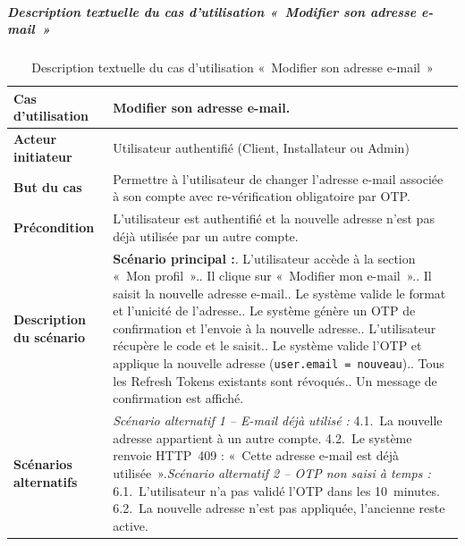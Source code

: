 \subparagraph{Description textuelle du cas d'utilisation «~Modifier son adresse e-mail~»}

\begin{table}[H]
  \caption{Description textuelle du cas d'utilisation «~Modifier son adresse e-mail~»}
  \label{tab:cu-modifier-email}
  \centering
  \begin{tabularx}{\textwidth}{|L{3.8cm}|X|}
    \hline
    \textbf{Cas d'utilisation} & Modifier son adresse e-mail. \\
    \hline
    \textbf{Acteur initiateur} & Utilisateur authentifié (Client, Installateur ou Admin) \\
    \hline
    \textbf{But du cas} & Permettre à l'utilisateur de changer l'adresse e-mail associée à son compte avec re-vérification obligatoire par OTP. \\
    \hline
    \textbf{Précondition} & L'utilisateur est authentifié et la nouvelle adresse n'est pas déjà utilisée par un autre compte. \\
    \hline
    \textbf{Description du scénario} &
    \textbf{Scénario principal :}. L'utilisateur accède à la section «~Mon profil~».. Il clique sur «~Modifier mon e-mail~».. Il saisit la nouvelle adresse e-mail.. Le système valide le format et l'unicité de l'adresse.. Le système génère un OTP de confirmation et l'envoie à la nouvelle adresse.. L'utilisateur récupère le code et le saisit.. Le système valide l'OTP et applique la nouvelle adresse (\texttt{user.email = nouveau}).. Tous les Refresh Tokens existants sont révoqués.. Un message de confirmation est affiché.\\
    \hline
    \textbf{Scénarios alternatifs} &
    \textit{Scénario alternatif 1 -- E-mail déjà utilisé :}\newline
    \hspace*{6pt}4.1.~La nouvelle adresse appartient à un autre compte.\newline
    \hspace*{6pt}4.2.~Le système renvoie HTTP~409 : «~Cette adresse e-mail est déjà utilisée~».\newline[2pt]
    \textit{Scénario alternatif 2 -- OTP non saisi à temps :}\newline
    \hspace*{6pt}6.1.~L'utilisateur n'a pas validé l'OTP dans les 10~minutes.\newline
    \hspace*{6pt}6.2.~La nouvelle adresse n'est pas appliquée, l'ancienne reste active.\\
    \hline
  \end{tabularx}
\end{table}

